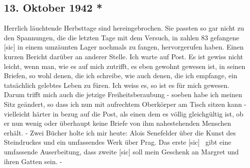 \subsection{13. Oktober 1942 *}

Herrlich l\"{a}uchtende Herbsttage sind hereingebrochen.
Sie passten so gar nicht zu den Spannungen, die die letzten Tage mit dem Versuch, in zahlen 83 gefangene{\color{red} [sic] } in einem umz\"{a}unten Lager nochmals zu fangen, hervorgerufen haben.
Einen kurzen Bericht dar\"{u}ber an anderer Stelle.
Ich warte auf Post.
Es ist gewiss nicht leicht, wenn man, wie es auf mich zutrifft, es eben gewohnt gewesen ist, in seinen Briefen, so wohl denen, die ich schreibe, wie auch denen, die ich empfange, ein tats\"{a}chlich gelebtes Leben zu f\"{u}ren.
Ich weiss es, so ist es f\"{u}r mich gewesen.
Darum trifft mich auch die jetzige Freiheitsberaubung - soeben habe ich meinen Sitz ge\"{a}ndert, so dass ich nun mit aufrechtem Oberk\"{o}rper am Tisch sitzen kann - vielleicht h\"{a}rter in bezug auf die Post, als einen dem es v\"{o}llig gleichg\"{u}ltig ist, ob er nun wenig oder \"{u}berhaupt keine Briefe von ihm nahestehenden Menschen erh\"{a}lt.
- Zwei B\"{u}cher holte ich mir heute: Alois Senefelder \"{u}ber die Kunst des Steindruckes und ein umfassendes Werk \"{u}ber Prag.
Das erste{\color{red} [sic] } gibt eine umfassende Auserbeitung, dass zweite{\color{red} [sic] } soll mein Geschenk an Margret und ihren Gatten sein. -

\clearpage
